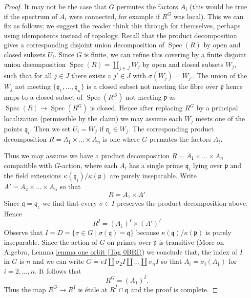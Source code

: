 \documentclass{amsart}
\theoremstyle{plain}
\theoremstyle{definition}
\theoremstyle{remark}
\numberwithin{equation}{subsection}
\def\Spec{\mathop{\mathrm{Spec}}}
\begin{document}
\begin{proof}
\medskip\noindent
It may not be the case that $G$ permutes the factors $A_i$
(this would be true if the spectrum of $A_i$ were connected,
for example if $R^G$ was local). This we can fix as follows;
we suggest the reader think this through for themselves, perhaps
using idempotents instead of topology.
Recall that the product decomposition gives a corresponding
disjoint union decomposition of $\Spec(R)$ by open and closed
subsets $U_i$. Since $G$ is finite, we can refine this covering
by a finite disjoint union decomposition
$\Spec(R) = \coprod_{j \in J} W_j$ by open
and closed subsets $W_j$, such that for all $j \in J$ there exists
a $j' \in J$ with $\sigma(W_j) = W_{j'}$. The union of the
$W_j$ not meeting $\{\mathfrak q_1, \ldots, \mathfrak q_n\}$
is a closed subset not meeting the fibre over $\mathfrak p$
hence maps to a closed subset of $\Spec(R^G)$ not meeting
$\mathfrak p$ as $\Spec(R) \to \Spec(R^G)$ is closed.
Hence after replacing $R^G$ by a principal localization
(permissible by the claim) we may assume each $W_j$ meets
one of the points $\mathfrak q_i$. Then we set $U_i = W_j$
if $\mathfrak q_i \in W_j$. The corresponding product decomposition
$R = A_1 \times \ldots \times A_n$ is one
where $G$ permutes the factors $A_i$.

\medskip\noindent
Thus we may assume we have a product decomposition
$R = A_1 \times \ldots \times A_n$ compatible with $G$-action,
where each $A_i$ has a single prime $\mathfrak q_i$ lying
over $\mathfrak p$ and the field extensions
$\kappa(\mathfrak q_i)/\kappa(\mathfrak p)$ are purely inseparable.
Write $A' = A_2 \times \ldots \times A_n$ so that
$$
R = A_1 \times A'
$$
Since $\mathfrak q = \mathfrak q_1$ we find that every
$\sigma \in I$ preserves the product decomposition above.
Hence
$$
R^I = (A_1)^I \times (A')^I
$$
Observe that $I = D = \{\sigma \in G \mid \sigma(\mathfrak q) = \mathfrak q\}$
because $\kappa(\mathfrak q)/\kappa(\mathfrak p)$ is purely inseparable.
Since the action of $G$ on primes over $\mathfrak p$ is transitive
(More on Algebra, Lemma \href{https://stacks.math.columbia.edu/tag/0BRI}{lemma one orbit (Tag 0BRI)})
we conclude that, the index of $I$ in $G$ is $n$ and we can write
$G = eI \amalg \sigma_2I \amalg \ldots \amalg \sigma_nI$ so that
$A_i = \sigma_i(A_1)$ for $i = 2, \ldots, n$. It follows that
$$
R^G = (A_1)^I.
$$
Thus the map $R^G \to R^I$ is \'etale at $R^I \cap \mathfrak q$
and the proof is complete.
\end{proof}
\end{document}
